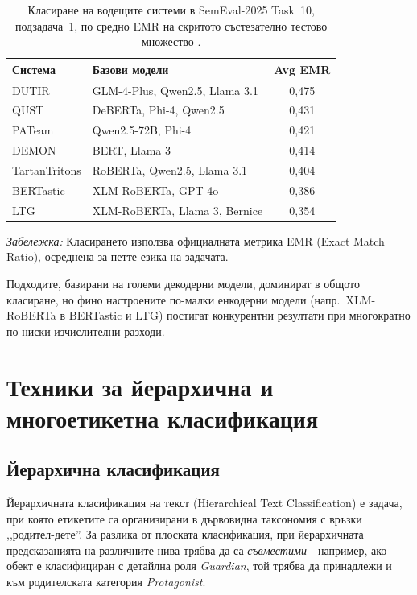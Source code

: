 \documentclass[12pt,a4paper]{report}
\begin{document}
\begin{table}[H]
\caption{Класиране на водещите системи в SemEval-2025 Task~10, подзадача~1, по средно EMR на скритото състезателно тестово множество \cite{piskorski2025semeval}.}
\label{tab:semeval_systems}
\begin{tabular}{llc}
\toprule
\textbf{Система} & \textbf{Базови модели} & \textbf{Avg EMR} \\
\midrule
DUTIR & GLM-4-Plus, Qwen2.5, Llama 3.1 & 0,475 \\
QUST & DeBERTa, Phi-4, Qwen2.5 & 0,431 \\
PATeam & Qwen2.5-72B, Phi-4 & 0,421 \\
DEMON & BERT, Llama 3 & 0,414 \\
TartanTritons & RoBERTa, Qwen2.5, Llama 3.1 & 0,404 \\
BERTastic & XLM-RoBERTa, GPT-4o & 0,386 \\
LTG & XLM-RoBERTa, Llama 3, Bernice & 0,354 \\
\bottomrule
\end{tabular}

\vspace{0.3em}
\small\textit{Забележка:} Класирането използва официалната метрика EMR (Exact Match Ratio), осреднена за петте езика на задачата.
\end{table}

Подходите, базирани на големи декодерни модели, доминират в общото класиране, но фино настроените по-малки енкодерни модели (напр.\ XLM-RoBERTa в BERTastic и LTG) постигат конкурентни резултати при многократно по-ниски изчислителни разходи.

\section{Техники за йерархична и многоетикетна класификация}

\subsection{Йерархична класификация}

Йерархичната класификация на текст (Hierarchical Text Classification) е задача, при която етикетите са организирани в дървовидна таксономия с връзки ,,родител-дете''. За разлика от плоската класификация, при йерархичната предсказанията на различните нива трябва да са \textit{съвместими} - например, ако обект е класифициран с детайлна роля \textit{Guardian}, той трябва да принадлежи и към родителската категория \textit{Protagonist}.
\end{document}
